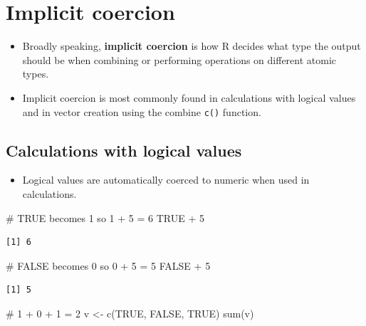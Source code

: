 \documentclass[
  letterpaper,
  DIV=11,
  numbers=noendperiod]{scrreprt}
\newenvironment{Shaded}{\begin{snugshade}}{\end{snugshade}}
\newcommand{\CommentTok}[1]{\textcolor[rgb]{0.37,0.37,0.37}{#1}}
\newcommand{\ConstantTok}[1]{\textcolor[rgb]{0.56,0.35,0.01}{#1}}
\newcommand{\DecValTok}[1]{\textcolor[rgb]{0.68,0.00,0.00}{#1}}
\newcommand{\FunctionTok}[1]{\textcolor[rgb]{0.28,0.35,0.67}{#1}}
\newcommand{\NormalTok}[1]{\textcolor[rgb]{0.00,0.23,0.31}{#1}}
\newcommand{\OtherTok}[1]{\textcolor[rgb]{0.00,0.23,0.31}{#1}}
\newcommand{\SpecialCharTok}[1]{\textcolor[rgb]{0.37,0.37,0.37}{#1}}
\providecommand{\tightlist}{%
  \setlength{\itemsep}{0pt}\setlength{\parskip}{0pt}}\usepackage{longtable,booktabs,array}
\begin{document}
\section{Implicit coercion}\label{implicit-coercion}

\begin{itemize}
\item
  Broadly speaking, \textbf{implicit coercion} is how R decides what
  type the output should be when combining or performing operations on
  different atomic types.
\item
  Implicit coercion is most commonly found in calculations with logical
  values and in vector creation using the combine \texttt{c()} function.
\end{itemize}

\subsection{Calculations with logical
values}\label{calculations-with-logical-values}

\begin{itemize}
\tightlist
\item
  Logical values are automatically coerced to numeric when used in
  calculations.
\end{itemize}

\begin{Shaded}
\begin{Highlighting}[]
\CommentTok{\# TRUE becomes 1 so 1 + 5 = 6}
\ConstantTok{TRUE} \SpecialCharTok{+} \DecValTok{5}     
\end{Highlighting}
\end{Shaded}

\begin{verbatim}
[1] 6
\end{verbatim}

\begin{Shaded}
\begin{Highlighting}[]
\CommentTok{\# FALSE becomes 0 so 0 + 5 = 5}
\ConstantTok{FALSE} \SpecialCharTok{+} \DecValTok{5}    
\end{Highlighting}
\end{Shaded}

\begin{verbatim}
[1] 5
\end{verbatim}

\begin{Shaded}
\begin{Highlighting}[]
\CommentTok{\# 1 + 0 + 1 = 2}
\NormalTok{v }\OtherTok{\textless{}{-}} \FunctionTok{c}\NormalTok{(}\ConstantTok{TRUE}\NormalTok{, }\ConstantTok{FALSE}\NormalTok{, }\ConstantTok{TRUE}\NormalTok{)}
\FunctionTok{sum}\NormalTok{(v)    }
\end{Highlighting}
\end{Shaded}
\end{document}
